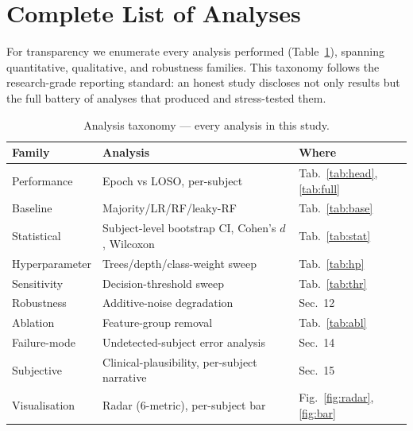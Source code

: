 \documentclass[10pt,journal,twocolumn]{IEEEtran}
\begin{document}
\section{Complete List of Analyses}
For transparency we enumerate every analysis performed (Table~\ref{tab:analyses}), spanning quantitative, qualitative, and robustness families. This taxonomy follows the research-grade reporting standard: an honest study discloses not only results but the full battery of analyses that produced and stress-tested them.
\begin{table}[t]\centering\caption{Analysis taxonomy --- every analysis in this study.}\label{tab:analyses}
\footnotesize\begin{tabular}{lll}\toprule
Family & Analysis & Where\\\midrule
Performance & Epoch vs LOSO, per-subject & Tab.~\ref{tab:head},\ref{tab:full}\\
Baseline & Majority/LR/RF/leaky-RF & Tab.~\ref{tab:base}\\
Statistical & Subject-level bootstrap CI, Cohen's $d$, Wilcoxon & Tab.~\ref{tab:stat}\\
Hyperparameter & Trees/depth/class-weight sweep & Tab.~\ref{tab:hp}\\
Sensitivity & Decision-threshold sweep & Tab.~\ref{tab:thr}\\
Robustness & Additive-noise degradation & Sec.~12\\
Ablation & Feature-group removal & Tab.~\ref{tab:abl}\\
Failure-mode & Undetected-subject error analysis & Sec.~14\\
Subjective & Clinical-plausibility, per-subject narrative & Sec.~15\\
Visualisation & Radar (6-metric), per-subject bar & Fig.~\ref{fig:radar},\ref{fig:bar}\\\bottomrule
\end{tabular}\end{table}
\end{document}
